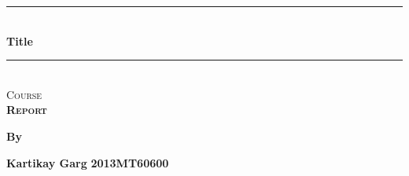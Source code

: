 \documentclass[12pt]{article}
\begin{document}
\begin{titlepage}

\newcommand{\HRule}{\rule{\linewidth}{0.5mm}} %

\center %
 

\HRule \\[0.4cm]
{ \large \bfseries Title}\\[0.3cm] %
\HRule \\[0.4cm]

\textsc{\Large Course}\\[0.5cm] %
\textsc{\large \textbf{Report}}\\[0.5cm] %


 
\vspace{2.5mm}

\begin{center} \large
\textbf{By}\\
\end{center}
\begin{minipage}{0.4 \textwidth}
\begin{center}
\textbf{Kartikay Garg}
\textbf{2013MT60600}
\vspace{1mm}
\end{center}
\end{minipage}
~


\end{titlepage}
\end{document}
